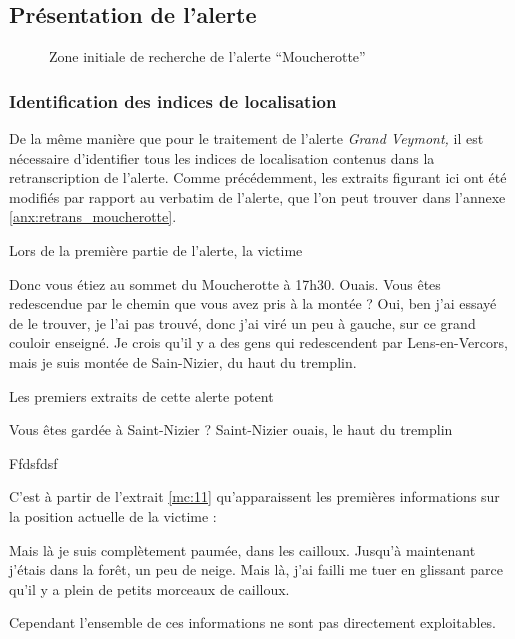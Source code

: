 
\subsection{Présentation de l'alerte}
\label{subsec:9-3-1}




\begin{figure}
  \centering
  
  \caption{Zone initiale de recherche de l'alerte
    \enquote{Moucherotte}}
  \label{fig:zir_moucherotte}
\end{figure}

\subsubsection{Identification des indices de localisation}
\label{subsec:9-3-1-1}

De la même manière que pour le traitement de l'alerte \emph{Grand
  Veymont,} il est nécessaire d'identifier tous les indices de
localisation contenus dans la retranscription de l'alerte. Comme
précédemment, les extraits figurant ici ont été modifiés par rapport
au verbatim de l'alerte, que l'on peut trouver dans l'annexe
\ref{anx:retrans_moucherotte}.


Lors de la première partie de l'alerte, la victime
%
\begin{dialogue}
  \Sec {} Donc vous étiez au sommet du Moucherotte à 17h30.
  \Req {} Ouais.
  \Sec {} Vous êtes redescendue par le chemin que
  vous avez pris à la montée ?
  \Req {} Oui, ben j’ai essayé de le trouver, je l’ai pas
  trouvé,  donc j’ai viré un peu à gauche,
   sur ce grand couloir enseigné.  Je
  crois qu’il y a des gens qui redescendent par Lens-en-Vercors,
   mais je suis montée de Sain-Nizier, du haut du
  tremplin.
\end{dialogue}
% 
Les premiers extraits de cette alerte potent

\begin{dialogue}
  \Sec {} Vous êtes gardée à Saint-Nizier ?
  \Req {} Saint-Nizier ouais, le haut du tremplin
\end{dialogue}
% 
Ffdsfdsf

C'est à partir de l'extrait \ref{mc:11} qu'apparaissent les premières
informations sur la position actuelle de la victime :
%
\begin{dialogue}
  \Req {} Mais là je suis complètement paumée,
   dans les cailloux.  Jusqu’à
  maintenant j’étais dans la forêt,  un peu de
  neige.  Mais là, j’ai failli me tuer en glissant
   parce qu’il y a plein de petits morceaux de
  cailloux.
\end{dialogue}
% 
Cependant l'ensemble de ces informations ne sont pas directement
exploitables.

